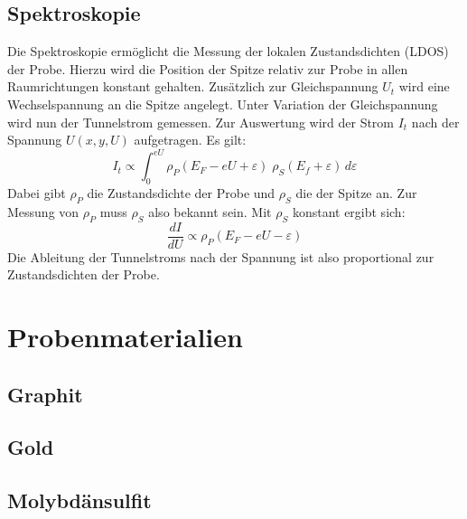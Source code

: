    \subsection{Spektroskopie}
    \label{spek}

Die Spektroskopie ermöglicht die Messung der lokalen Zustandsdichten (LDOS) der
Probe. Hierzu wird die Position der Spitze relativ zur Probe in allen Raumrichtungen
konstant gehalten. Zusätzlich zur Gleichspannung $U_t$ wird eine Wechselspannung an 
die Spitze angelegt. Unter Variation der Gleichspannung wird nun der Tunnelstrom
gemessen. Zur Auswertung wird der Strom $I_t$ nach der Spannung $U(x,y,U)$ 
aufgetragen. Es gilt:
\[
    I_t \propto \int_0^{eU} \rho_P (E_F - eU + \varepsilon) \; 
                            \rho_S (E_f + \varepsilon) \, d \varepsilon
\]
Dabei gibt $\rho_P$ die Zustandsdichte der Probe und $\rho_S$ die der Spitze an.
Zur Messung von $\rho_P$ muss $\rho_S$ also bekannt sein. Mit $\rho_S$ konstant
ergibt sich:
\[
    \frac{dI}{dU} \propto \rho_P (E_F - eU - \varepsilon)
\]
Die Ableitung der Tunnelstroms nach der Spannung ist also proportional zur 
Zustandsdichten der Probe. 
\cite{beschr}

\section{Probenmaterialien}
    \subsection{Graphit}
    \subsection{Gold}
    \subsection{Molybdänsulfit}
